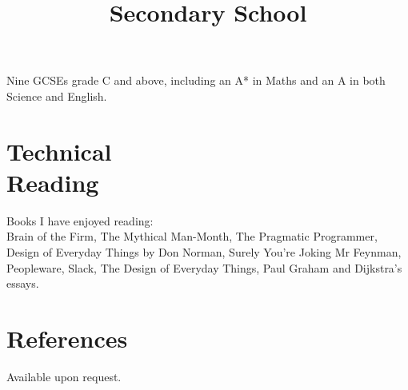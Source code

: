 \documentclass[line,margin]{res}
\begin{document}
\begin{resume}
\begin{position}
\begin{comment}
\begin{tabular}{ l r r }
	Computing & A Level & B \\
	Maths & A Level & C \\
	Chemistry & A Level & D \\
	Physics & AS Level & D \\
	Critical Thinking & AS Level & E \\
\end{tabular}
\end{comment}
\end{position}

\title{Secondary School}
\begin{position}
Nine GCSEs grade C and above,
including an A* in Maths and an A in both Science and English.

\begin{comment}
\begin{tabular}{ l r r }
	Mathematics & (a year early) GCSE & A* \\
	Science & Double Award GCSE & AA \\
	English & GCSE & A \\
	History & GCSE & B \\
	Systems \& Control & GCSE & B \\
	ICT & Short Course GCSE & C \\
	Statistics & GCSE & C \\
	English Literature & GCSE & C \\
	Geography & GCSE & D \\
	Drama & GCSE & F \\
\end{tabular}
\end{comment}
\end{position}

\section{Technical \\ Reading}
Books I have enjoyed reading: \\
Brain of the Firm,
The Mythical Man-Month, %
The Pragmatic Programmer,
Design of Everyday Things by Don Norman,
Surely You're Joking Mr Feynman,
Peopleware, %
Slack,
The Design of Everyday Things,
Paul Graham and Dijkstra's essays.

\section{References}
Available upon request.

\end{resume}



\end{document}
